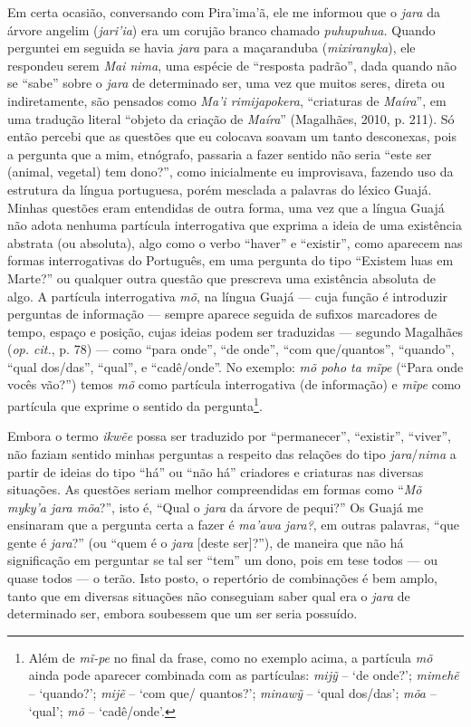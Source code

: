Em certa ocasião, conversando com Pira'ima'ã, ele me informou que o
\emph{jara} da árvore angelim (\emph{jari'ia}) era um corujão branco
chamado \emph{puhupuhua.} Quando perguntei em seguida se havia
\emph{jara} para a maçaranduba (\emph{mixiranyka}), ele respondeu serem
\emph{Mai nima}, uma espécie de ``resposta padrão'', dada quando não se
``sabe'' sobre o \emph{jara} de determinado ser, uma vez que muitos
seres, direta ou indiretamente, são pensados como \emph{Ma'i
rimijapokera}, ``criaturas de \emph{Maíra}'', em uma tradução literal
``objeto da criação de \emph{Maíra}'' (Magalhães, 2010, p. 211). Só então
percebi que as questões que eu colocava soavam um tanto desconexas, pois
a pergunta que a mim, etnógrafo, passaria a fazer sentido não seria
``este ser (animal, vegetal) tem dono?'', como inicialmente eu
improvisava, fazendo uso da estrutura da língua portuguesa, porém
mesclada a palavras do léxico Guajá. Minhas questões eram entendidas de
outra forma, uma vez que a língua Guajá não adota nenhuma partícula
interrogativa que exprima a ideia de uma existência abstrata (ou
absoluta), algo como o verbo ``haver'' e ``existir'', como aparecem nas
formas interrogativas do Português, em uma pergunta do tipo ``Existem
luas em Marte?'' ou qualquer outra questão que prescreva uma existência
absoluta de algo. A partícula interrogativa \emph{mõ}, na língua Guajá ---
cuja função é introduzir perguntas de informação --- sempre aparece
seguida de sufixos marcadores de tempo, espaço e posição, cujas ideias
podem ser traduzidas --- segundo Magalhães (\emph{op. cit.}, p. 78) --- como ``para
onde'', ``de onde'', ``com que/quantos'', ``quando'', ``qual dos/das'', ``qual'', e
``cadê/onde''. No exemplo: \emph{mõ poho ta mĩpe} (``Para onde vocês vão?'')
temos \emph{mõ} como partícula interrogativa (de informação) e
\emph{mĩpe} como partícula que exprime o sentido da pergunta\footnote{Além
  de \emph{mĩ-pe} no final da frase, como no exemplo acima, a partícula
  \emph{mõ} ainda pode aparecer combinada com as partículas: \emph{mijỹ}
  -- `de onde?'; \emph{mimehẽ} -- `quando?'; \emph{mijẽ} -- `com que/
  quantos?'; \emph{minawỹ} -- `qual dos/das'; \emph{mõa} -- `qual';
  \emph{mõ} -- `cadê/onde'.}.

Embora o termo \emph{ikwẽe} possa ser traduzido por ``permanecer'',
``existir'', ``viver'', não faziam sentido minhas perguntas a respeito das
relações do tipo \emph{jara}/\emph{nima} a partir de ideias do tipo ``há''
ou ``não há'' criadores e criaturas nas diversas situações. As questões
seriam melhor compreendidas em formas como ``\emph{Mõ myky'a jara mõa}?'',
isto é, ``Qual o \emph{jara} da árvore de pequi?'' Os Guajá me ensinaram
que a pergunta certa a fazer é \emph{ma'awa jara?}, em outras palavras,
``que gente é \emph{jara}?'' (ou ``quem é o \emph{jara} {[}deste ser{]}?''),
de maneira que não há significação em perguntar se tal ser ``tem'' um
dono, pois em tese todos --- ou quase todos --- o terão. Isto posto, o
repertório de combinações é bem amplo, tanto que em diversas situações
não conseguiam saber qual era o \emph{jara} de determinado ser, embora
soubessem que um ser seria possuído.

